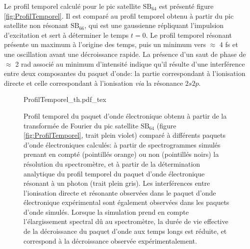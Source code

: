 Le profil temporel calculé pour le pic satellite $\text{SB}_{64}$ est présenté figure \ref{fig:ProfilTemporel}. Il est comparé au profil temporel obtenu à partir du pic satellite non résonant $\text{SB}_{66}$, qui est une gaussienne répliquant l'impulsion d'excitation et sert à déterminer le temps $t = 0$. Le profil temporel résonant présente un maximum à l'origine des temps, puis un minimum vers $\approx$ 4 fs et une oscillation avant une décroissance rapide. La présence d'un saut de phase de $\approx$ 2 rad associé au minimum d'intensité indique qu'il résulte d'une interférence entre deux composantes du paquet d'onde: la partie correspondant à l'ionisation directe et celle correspondant à l'ionisation \textit{via} la résonance $2s2p$. 

\begin{figure}
\centering
\def\svgwidth{0.7\textwidth}
{ProfilTemporel_th.pdf_tex}
\caption{Profil temporel du paquet d'onde électronique obtenu à partir de la transformée de Fourier du pic satellite $\text{SB}_{64}$ (figure \ref{fig:ProfilTemporel}, trait plein violet) comparé à différents paquets d'onde électroniques calculés: à partir de spectrogrammes simulés prenant en compté (pointillés orange) ou non (pointillés noirs) la résolution du spectromètre, et à partir de la détermination analytique du profil temporel du paquet d'onde électronique résonant à un photon (trait plein gris). Les interférences entre l'ionisation directe et résonante observées dans le paquet d'onde électronique expérimental sont également observées dans les paquets d'onde simulés. Lorsque la simulation prend en compte l'élargissement spectral dû au spectromètre, la durée de vie effective de la décroissance du paquet d'onde aux temps longs est réduite, et correspond à la décroissance observée expérimentalement.} 
\label{fig:ProfilTemporel_th}
\end{figure}


